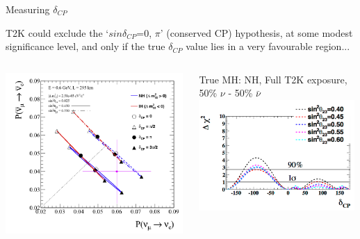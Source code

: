 %
%
\begin{frame}{Measuring $\delta_{CP}$}

T2K could exclude the  `{\color{magenta}$sin\delta_{CP}$=0, $\pi$}'
(conserved CP) hypothesis, at some modest
significance level, and only if the true $\delta_{CP}$ value lies in a
very favourable region...

\begin{columns}[T]
  \begin{column}{0.50\textwidth}
    \begin{center}
       \includegraphics[width=0.99\textwidth]{./images/biprob/biprob_expt_poorprecision_t2k_matter_non_maximal}
    \end{center}
  \end{column}
  \begin{column}{0.50\textwidth}
    \begin{center}
      {\small
         True MH: NH, Full T2K exposure,\\ 50\% $\nu$ - 50\% $\bar{\nu}$\\
       }
       \includegraphics[width=0.99\textwidth]{./images/biprob/exclude_sindelta0_50nu50nubar_nh_selected_theta23}

\end{center}
\end{column}
\end{columns}
\end{frame}
